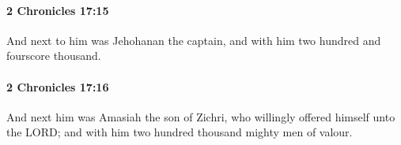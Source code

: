 		\paragraph{2 Chronicles 17:15} %
			\label{2CHRONICLES-17-15}

			And next to him was Jehohanan the captain, and with him two hundred and fourscore thousand.


		\paragraph{2 Chronicles 17:16} %
			\label{2CHRONICLES-17-16}

			And next him was Amasiah the son of Zichri, who willingly offered himself unto the LORD; and with him two hundred thousand mighty men of valour.



